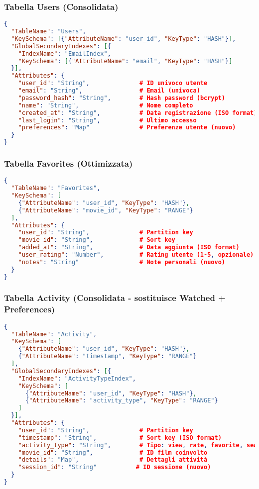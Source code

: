 \documentclass[11pt,a4paper]{article}
\begin{document}
\subsubsection{Tabella Users (Consolidata)}
\begin{lstlisting}[language=JSON, caption=Schema Tabella Users]
{
  "TableName": "Users",
  "KeySchema": [{"AttributeName": "user_id", "KeyType": "HASH"}],
  "GlobalSecondaryIndexes": [{
    "IndexName": "EmailIndex",
    "KeySchema": [{"AttributeName": "email", "KeyType": "HASH"}]
  }],
  "Attributes": {
    "user_id": "String",              # ID univoco utente
    "email": "String",                # Email (univoca)
    "password_hash": "String",        # Hash password (bcrypt)
    "name": "String",                 # Nome completo
    "created_at": "String",           # Data registrazione (ISO format)
    "last_login": "String",           # Ultimo accesso
    "preferences": "Map"              # Preferenze utente (nuovo)
  }
}
\end{lstlisting}

\subsubsection{Tabella Favorites (Ottimizzata)}
\begin{lstlisting}[language=JSON, caption=Schema Tabella Favorites]
{
  "TableName": "Favorites",
  "KeySchema": [
    {"AttributeName": "user_id", "KeyType": "HASH"},
    {"AttributeName": "movie_id", "KeyType": "RANGE"}
  ],
  "Attributes": {
    "user_id": "String",              # Partition key
    "movie_id": "String",             # Sort key
    "added_at": "String",             # Data aggiunta (ISO format)
    "user_rating": "Number",          # Rating utente (1-5, opzionale)
    "notes": "String"                 # Note personali (nuovo)
  }
}
\end{lstlisting}

\subsubsection{Tabella Activity (Consolidata - sostituisce Watched + Preferences)}
\begin{lstlisting}[language=JSON, caption=Schema Tabella Activity]
{
  "TableName": "Activity",
  "KeySchema": [
    {"AttributeName": "user_id", "KeyType": "HASH"},
    {"AttributeName": "timestamp", "KeyType": "RANGE"}
  ],
  "GlobalSecondaryIndexes": [{
    "IndexName": "ActivityTypeIndex",
    "KeySchema": [
      {"AttributeName": "user_id", "KeyType": "HASH"},
      {"AttributeName": "activity_type", "KeyType": "RANGE"}
    ]
  }],
  "Attributes": {
    "user_id": "String",              # Partition key
    "timestamp": "String",            # Sort key (ISO format)
    "activity_type": "String",        # Tipo: view, rate, favorite, search, watch
    "movie_id": "String",             # ID film coinvolto
    "details": "Map",                 # Dettagli attività
    "session_id": "String"           # ID sessione (nuovo)
  }
}
\end{lstlisting}
\end{document}
